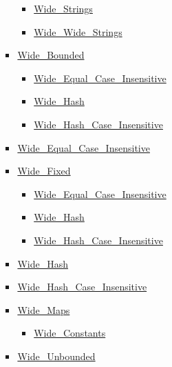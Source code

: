 \documentclass[english]{article}
\begin{document}
\begin{scriptsize}
\begin{multicols*}{5}
\begin{itemize}[leftmargin=0mm]
\begin{itemize}[leftmargin=5mm]
\begin{itemize}[leftmargin=5mm]
\begin{itemize}[leftmargin=5mm]
	  \item[] \href{http://www.ada-auth.org/standards/22rm/html/RM-A-4-11.html}{Wide\_Strings}
	  \item[] \href{http://www.ada-auth.org/standards/22rm/html/RM-A-4-11.html}{Wide\_Wide\_Strings}
	  \end{itemize}
	\item[] \href{http://www.ada-auth.org/standards/22rm/html/RM-A-4-7.html}{Wide\_Bounded}
	  \begin{itemize}[leftmargin=5mm]
	  \item[] \href{http://www.ada-auth.org/standards/22rm/html/RM-A-4-7.html}{Wide\_Equal\_Case\_Insensitive}
	  \item[] \href{http://www.ada-auth.org/standards/22rm/html/RM-A-4-7.html}{Wide\_Hash}
	  \item[] \href{http://www.ada-auth.org/standards/22rm/html/RM-A-4-7.html}{Wide\_Hash\_Case\_Insensitive}
	  \end{itemize}
	\item[] \href{http://www.ada-auth.org/standards/22rm/html/RM-A-4-7.html}{Wide\_Equal\_Case\_Insensitive}
	\item[] \href{http://www.ada-auth.org/standards/22rm/html/RM-A-4-7.html}{Wide\_Fixed}
	  \begin{itemize}[leftmargin=5mm]
	  \item[] \href{http://www.ada-auth.org/standards/22rm/html/RM-A-4-7.html}{Wide\_Equal\_Case\_Insensitive}
	  \item[] \href{http://www.ada-auth.org/standards/22rm/html/RM-A-4-7.html}{Wide\_Hash}
	  \item[] \href{http://www.ada-auth.org/standards/22rm/html/RM-A-4-7.html}{Wide\_Hash\_Case\_Insensitive}
	  \end{itemize}
	\item[] \href{http://www.ada-auth.org/standards/22rm/html/RM-A-4-7.html}{Wide\_Hash}
	\item[] \href{http://www.ada-auth.org/standards/22rm/html/RM-A-4-7.html}{Wide\_Hash\_Case\_Insensitive}
	\item[] \href{http://www.ada-auth.org/standards/22rm/html/RM-A-4-7.html}{Wide\_Maps}
	  \begin{itemize}[leftmargin=5mm]
	  \item[] \href{http://www.ada-auth.org/standards/22rm/html/RM-A-4-7.html}{Wide\_Constants}
	  \end{itemize}
	\item[] \href{http://www.ada-auth.org/standards/22rm/html/RM-A-4-7.html}{Wide\_Unbounded}

\end{itemize}
\end{itemize}
\end{itemize}
\end{multicols*}
\end{scriptsize}
\end{document}
